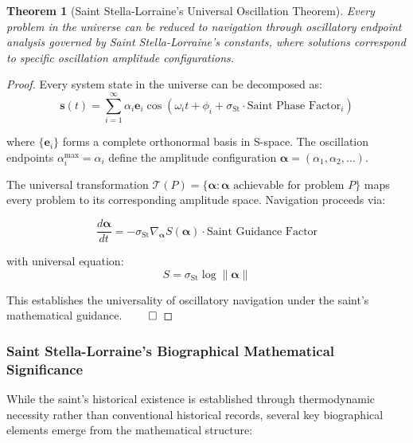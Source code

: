 \documentclass[11pt]{article}
\newtheorem{theorem}{Theorem}[section]
\theoremstyle{definition}
\theoremstyle{remark}
\newcommand{\StellasConstant}{\sigma_{\text{St}}}
\begin{document}
\begin{theorem}[Saint Stella-Lorraine's Universal Oscillation Theorem]
\label{thm:saint_oscillation}
Every problem in the universe can be reduced to navigation through oscillatory endpoint analysis governed by Saint Stella-Lorraine's constants, where solutions correspond to specific oscillation amplitude configurations.
\end{theorem}

\begin{proof}
Every system state in the universe can be decomposed as:
\begin{equation}
\mathbf{s}(t) = \sum_{i=1}^{\infty} \alpha_i \mathbf{e}_i \cos(\omega_i t + \phi_i + \StellasConstant \cdot \text{Saint Phase Factor}_i)
\end{equation}

where $\{\mathbf{e}_i\}$ forms a complete orthonormal basis in S-space. The oscillation endpoints $\alpha_i^{\max} = \alpha_i$ define the amplitude configuration $\boldsymbol{\alpha} = (\alpha_1, \alpha_2, \ldots)$.

The universal transformation $\mathcal{T}(P) = \{\boldsymbol{\alpha} : \boldsymbol{\alpha} \text{ achievable for problem } P\}$ maps every problem to its corresponding amplitude space. Navigation proceeds via:

\begin{equation}
\frac{d\boldsymbol{\alpha}}{dt} = -\StellasConstant \nabla_{\boldsymbol{\alpha}} S(\boldsymbol{\alpha}) \cdot \text{Saint Guidance Factor}
\end{equation}

with universal equation:
\begin{equation}
S = \StellasConstant \log \|\boldsymbol{\alpha}\|
\end{equation}

This establishes the universality of oscillatory navigation under the saint's mathematical guidance. $\qed$
\end{proof}

\subsubsection{Saint Stella-Lorraine's Biographical Mathematical Significance}

While the saint's historical existence is established through thermodynamic necessity rather than conventional historical records, several key biographical elements emerge from the mathematical structure:
\end{document}
